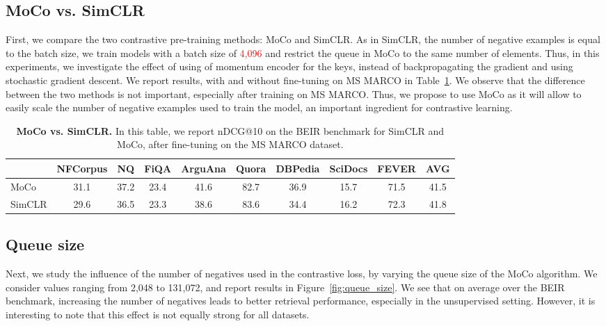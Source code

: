 \subsection{MoCo vs. SimCLR}
First, we compare the two contrastive pre-training methods: MoCo and SimCLR.
As in SimCLR, the number of negative examples is equal to the batch size, we train models with a batch size of \textcolor{red}{4,096} and restrict the queue in MoCo to the same number of elements.
Thus, in this experiments, we investigate the effect of using of momentum encoder for the keys, instead of backpropagating the gradient and using stochastic gradient descent.
We report results, with and without fine-tuning on MS MARCO in Table~\ref{tab:simclr_vs_moco}.
We observe that the difference between the two methods is not important, especially after training on MS MARCO.
Thus, we propose to use MoCo as it will allow to easily scale the number of negative examples used to train the model, an important ingredient for contrastive learning.

\begin{table}[h]
  \center
  \small
  \begin{tabular}{l ccccccccc}
    \toprule
           & NFCorpus  & NQ   & FiQA & ArguAna & Quora & DBPedia & SciDocs & FEVER & AVG \\
    \midrule
    MoCo   & 31.1 & 37.2 & 23.4 & 41.6 & 82.7 & 36.9 & 15.7 & 71.5 & 41.5 \\
    SimCLR & 29.6 & 36.5 & 23.3 & 38.6 & 83.6 & 34.4 & 16.2 & 72.3 & 41.8 \\
    \bottomrule
  \end{tabular}
  \label{tab:simclr_vs_moco}
  \caption{\textbf{MoCo vs. SimCLR.} In this table, we report nDCG@10 on the BEIR benchmark for SimCLR and MoCo, after fine-tuning on the MS MARCO dataset.}
\end{table}

\subsection{Queue size}
Next, we study the influence of the number of negatives used in the contrastive loss, by varying the queue size of the MoCo algorithm.
We consider values ranging from 2,048 to 131,072, and report results in Figure~\ref{fig:queue_size}.
We see that on average over the BEIR benchmark, increasing the number of negatives leads to better retrieval performance, especially in the unsupervised setting.
However, it is interesting to note that this effect is not equally strong for all datasets.

